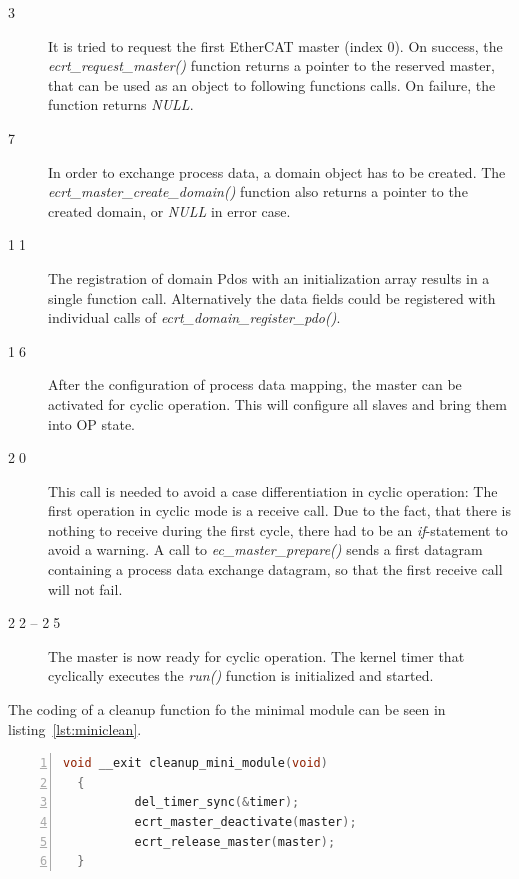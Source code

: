 \documentclass[a4paper,12pt,BCOR6mm,bibtotoc,idxtotoc]{scrbook}
\begin{document}
\begin{description}
\item[\normalfont\textcircled{\tiny 3}] It is tried to request the
  first EtherCAT master (index 0). On success, the
  \textit{ecrt\_\-request\_\-master()} function returns a pointer to
  the reserved master, that can be used as an object to following
  functions calls. On failure, the function returns \textit{NULL}.
\item[\normalfont\textcircled{\tiny 7}] In order to exchange process
  data, a domain object has to be created. The
  \textit{ecrt\_\-master\_\-create\_domain()} function also returns a
  pointer to the created domain, or \textit{NULL} in error case.
\item[\normalfont\textcircled{\tiny 11}] The registration of domain
  Pdos with an initialization array results in a single function call.
  Alternatively the data fields could be registered with individual
  calls of \textit{ecrt\_domain\_register\_pdo()}.
\item[\normalfont\textcircled{\tiny 16}] After the configuration of
  process data mapping, the master can be activated for cyclic
  operation. This will configure all slaves and bring them into
  OP state.
\item[\normalfont\textcircled{\tiny 20}] This call is needed to avoid
  a case differentiation in cyclic operation: The first operation in
  cyclic mode is a receive call. Due to the fact, that there is
  nothing to receive during the first cycle, there had to be an
  \textit{if}-statement to avoid a warning. A call to
  \textit{ec\_master\_prepare()} sends a first datagram containing a
  process data exchange datagram, so that the first receive call will
  not fail.
\item[\normalfont\textcircled{\tiny 22} -- \textcircled{\tiny 25}] The
  master is now ready for cyclic operation. The kernel timer that
  cyclically executes the \textit{run()} function is initialized and
  started.
\end{description}

The coding of a cleanup function fo the minimal module can be seen in
listing~\ref{lst:miniclean}.

\begin{lstlisting}[language=C,numbers=left,caption={Minimal cleanup
    function},label={lst:miniclean}]
  void __exit cleanup_mini_module(void)
  {
          del_timer_sync(&timer);
          ecrt_master_deactivate(master);
          ecrt_release_master(master);
  }
\end{lstlisting}
\end{document}
